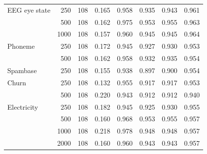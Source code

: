 {\begin{tabular}{lrr rrrr r}
EEG eye state & 250 & 108 & 0.165 & 0.958 & 0.935 & 0.943 & 0.961 \\
 & 500 & 108 & 0.162 & 0.975 & 0.953 & 0.955 & 0.963 \\
 & 1000 & 108 & 0.157 & 0.960 & 0.945 & 0.945 & 0.964 \\
\addlinespace
Phoneme & 250 & 108 & 0.172 & 0.945 & 0.927 & 0.930 & 0.953 \\
 & 500 & 108 & 0.162 & 0.958 & 0.932 & 0.935 & 0.954 \\
\addlinespace
Spambase & 250 & 108 & 0.155 & 0.938 & 0.897 & 0.900 & 0.954 \\
\addlinespace
Churn & 250 & 108 & 0.132 & 0.955 & 0.917 & 0.917 & 0.953 \\
 & 500 & 108 & 0.220 & 0.943 & 0.912 & 0.912 & 0.940 \\
\addlinespace
Electricity & 250 & 108 & 0.182 & 0.945 & 0.925 & 0.930 & 0.955 \\
 & 500 & 108 & 0.160 & 0.968 & 0.953 & 0.955 & 0.957 \\
 & 1000 & 108 & 0.218 & 0.978 & 0.948 & 0.948 & 0.957 \\
 & 2000 & 108 & 0.160 & 0.960 & 0.943 & 0.943 & 0.957 \\
\bottomrule\end{tabular}}
